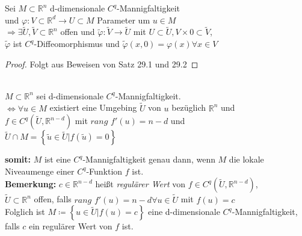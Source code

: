 \begin{folgerung}
Sei $M \subset \mathbb{R}^n$ d-dimensionale $C^q$-Mannigfaltigkeit \\
und $\varphi: V \subset \mathbb{R}^d \rightarrow U \subset M $ Parameter um $u \in M $ \\
$\Longrightarrow \exists \tilde{U}, \tilde{V} \subset \mathbb{R}^n $ offen und 
$\tilde{\varphi} : \tilde{V} \rightarrow \tilde{U} $ 
mit $ U \subset \tilde{U}, V \times {0} \subset \tilde{V} $, \\
$\tilde{\varphi} $ ist $C^q$-Diffeomorphismus und
$\tilde{\varphi} (x, 0) = \varphi (x) \forall x \in V $
\end{folgerung}

\begin{proof}
Folgt aus Beweisen von Satz 29.1 und 29.2
\end{proof}

\begin{theo}
\mbox{} \\
$M \subset \mathbb{R}^n $ sei d-dimensionale $C^q$-Mannigfaltigkeit. \\
$\Longleftrightarrow \forall u \in M $ existiert eine Umgebing $\tilde{U}$ von $u$
bezüglich $\mathbb{R}^n$ und \\
$f \in C^q \left( \tilde{U}, \mathbb{R}^{n-d} \right)$ 
mit $\textit{rang } f' (u) = n-d $ und \\
$\tilde{U} \cap M = \left\lbrace \tilde{u} \in \tilde{U} | f (\tilde{u}) = 0 \right\rbrace $
\end{theo}

\textbf{somit:} $M$ ist eine $C^q$-Mannigfaltigkeit genau dann, 
wenn $M$ die lokale Niveaumenge einer $C^q$-Funktion $f$ ist. \\

\textbf{Bemerkung:} $c \in \mathbb{R}^{n-d} $ heißt \textit{regulärer Wert} von
$f \in C^q \left( \tilde{U}, \mathbb{R}^{n-d} \right) $, \\
$\tilde{U} \subset \mathbb{R}^n $
offen, falls $\textit{rang } f' (u) = n-d \forall u \in \tilde{U} $ mit $f(u) = c $ \\
Folglich ist $M \coloneqq \left\lbrace u \in \tilde{U} | f(u) = c \right\rbrace $ 
eine d-dimensionale $C^q$-Mannigfaltigkeit, falls $c$ ein regulärer Wert von $f$ ist.

